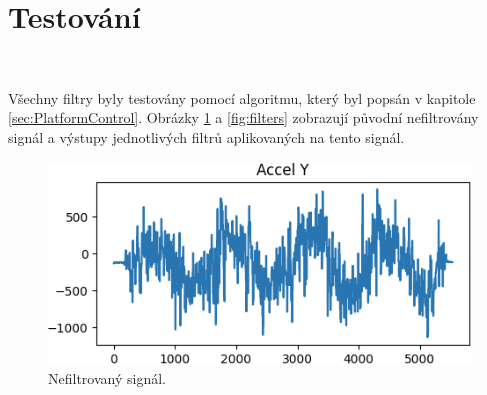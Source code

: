 \section{Testování}\

Všechny filtry byly testovány pomocí algoritmu, který byl popsán v kapitole
\ref{sec:PlatformControl}. Obrázky \ref{fig:NoFilter} a \ref{fig:filters} zobrazují
původní nefiltrovány signál a výstupy jednotlivých filtrů aplikovaných na tento
signál.

\begin{figure}[!h]
	\centering
	\vspace{-5pt}
    \includegraphics[width = 0.7\linewidth]{Figures/NoFilter.png}
    \caption{Nefiltrovaný signál.}
    \label{fig:NoFilter}
    \vspace{-10pt}
\end{figure}

